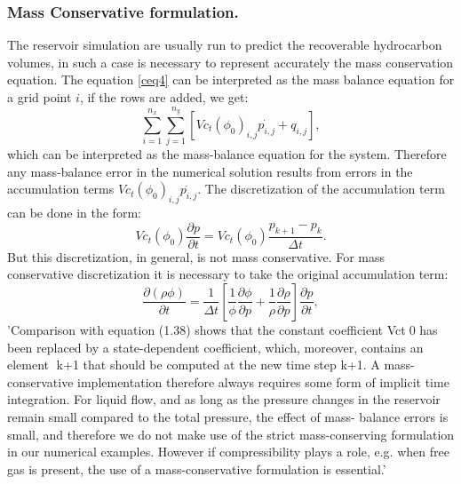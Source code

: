 \documentclass[a4paper,10pt]{report}
\begin{document}
\subsubsection{Mass Conservative formulation.}
The reservoir simulation are usually run to predict the recoverable hydrocarbon volumes, 
in such a case is necessary to represent accurately the mass conservation equation.
The equation \eqref{ceq4} can be interpreted as the mass balance equation for a grid point $i$,
if the rows are added, we get:
\begin{equation}
 \sum_{i=1}^{n_x} \sum_{j=1}^{n_y}[Vc_t(\phi_0)_{i,j}\dot{p_{i,j}}+q_{i,j}],
\end{equation}
which can be interpreted as the mass-balance equation for the system. Therefore any mass-balance
error in the numerical solution results from errors in the accumulation terms 
$Vc_t(\phi_0)_{i,j}\dot{p_{i,j}}.$
The discretization of the accumulation term can be done in the form:
\begin{equation}
 Vc_t(\phi_0)\frac{\partial p}{\partial t}=Vc_t(\phi_0)\frac{p_{k+1}-p_{k}}{\Delta t}.
\end{equation}
But this discretization, in general, is not mass conservative. For mass conservative discretization
it is necessary to take the original accumulation term:
\begin{equation*}
 \frac{\partial(\rho \phi)}{\partial t}=\frac{1}{\Delta t}\left[
 \frac{1}{\phi}\frac{\partial \phi}{\partial p}+\frac{1}{\rho}\frac{\partial\rho }{\partial p}
\right]\frac{\partial p}{\partial t},
 \end{equation*}
'Comparison with equation (1.38) shows that the constant coefficient Vct0 has been replaced
by a state-dependent coefficient, which, moreover, contains an element k+1 that should be
computed at the new time step k+1. A mass-conservative implementation therefore always
requires some form of implicit time integration. For liquid flow, and as long as the pressure
changes in the reservoir remain small compared to the total pressure, the effect of mass-
balance errors is small, and therefore we do not make use of the strict mass-conserving
formulation in our numerical examples. However if compressibility plays a role, e.g. when
free gas is present, the use of a mass-conservative formulation is essential.'
\newpage
\end{document}
